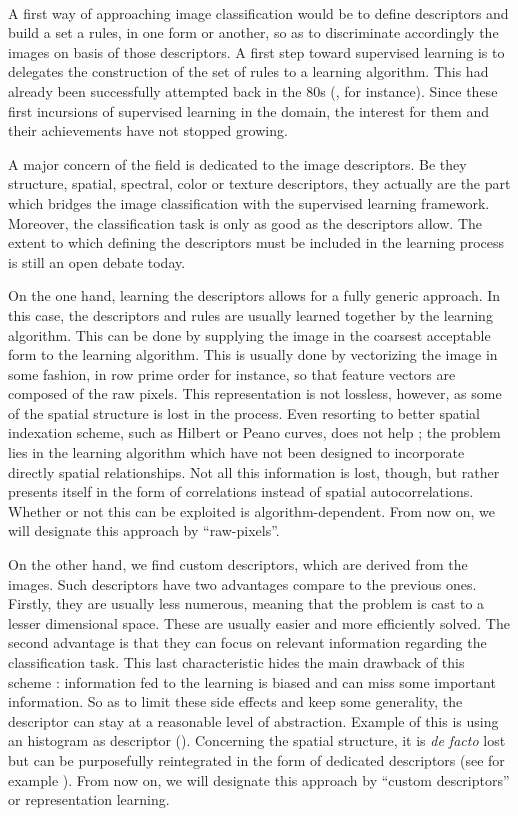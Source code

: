 \documentclass[a4paper]{report}
\begin{document}
\paragraph{}
A first way of approaching image classification would be to define descriptors and build a set a rules, in one form or another, so as to discriminate accordingly the images on basis of those descriptors. A first step toward supervised learning is to delegates the construction of the set of rules to a learning algorithm. This had already been successfully attempted back in the 80s (\cite{earlyDecisionTree}, for instance). Since these first incursions of supervised learning in the domain, the interest for them and their achievements have not stopped growing. 
\par
A major concern of the field is dedicated to the image descriptors. Be they structure, spatial, spectral, color or texture descriptors, they actually are the part which bridges the image classification with the supervised learning framework. Moreover, the classification task is only as good as the descriptors allow. The extent to which defining the descriptors must be included in the learning process is still an open debate today. 
\par
On the one hand, learning the descriptors allows for a fully generic approach. In this case, the descriptors and rules are usually learned together by the learning algorithm. This can be done by supplying the image in the coarsest acceptable form to the learning algorithm. This is usually done by vectorizing the image in some fashion, in row prime order for instance, so that feature vectors are composed of the raw pixels. This representation is not lossless, however, as some of the spatial structure is lost in the process. Even resorting to better spatial indexation scheme, such as Hilbert or Peano curves, does not help ; the problem lies in the learning algorithm which have not been designed to incorporate directly spatial relationships. Not all this information is lost, though, but rather presents itself in the form of correlations instead of spatial autocorrelations. Whether or not this can be exploited is algorithm-dependent. From now on, we will designate this approach by ``raw-pixels''.
\par
On the other hand, we find custom descriptors, which are derived from the images. Such descriptors have two advantages compare to the previous ones. Firstly, they are usually less numerous, meaning that the problem is cast to a lesser dimensional space. These are usually easier and more efficiently solved. The second advantage is that they can focus on relevant information regarding the classification task. This last characteristic hides the main drawback of this scheme : information fed to the learning is biased and can miss some important information. So as to limit these side effects and keep some generality, the descriptor can stay at a reasonable level of abstraction. Example of this is using an histogram as descriptor (\cite{histoIntersectSVM}). Concerning the spatial structure, it is \textit{de facto} lost but can be purposefully reintegrated in the form of dedicated descriptors (see for example \cite{geostat}). From now on, we will designate this approach by ``custom descriptors'' or representation learning.
\end{document}
